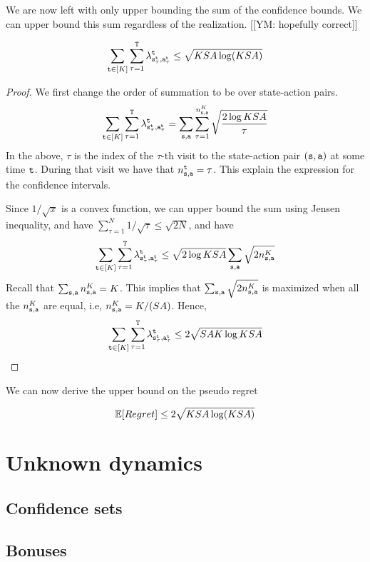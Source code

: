 We are now left with only upper bounding the sum of the confidence bounds.
We can upper bound this sum regardless of the realization. [[YM: hopefully correct]]

\begin{lemma}
    \[
    \sum_{{\tt t}\in [K]} \sum_{\tau=1}^{\tt T}
\lambda^{\tt t}_{{\tt s}_\tau^{\tt t},{\tt a}_\tau^{\tt t}} 
    \leq \sqrt{KSA\log (KSA)}
    \]
\end{lemma}

\begin{proof}
    We first change the order of summation to be over state-action pairs.
    \[
    \sum_{{\tt t}\in [K]} \sum_{\tau=1}^{\tt T}
\lambda^{\tt t}_{{\tt s}_\tau^{\tt t},{\tt a}_\tau^{\tt t}} =
\sum_{{\tt s},{\tt a}} \sum_{\tau=1}^{n_{{\tt s},{\tt a}}^K}
\sqrt{\frac{2\log KSA}{\tau}}
    \]
In the above, $\tau$ is the index of the $\tau$-th visit to the state-action pair $({\tt s},{\tt a})$ at some time ${\tt t}$. During that visit we have that  $n_{{\tt s},{\tt a}}^{\tt t}=\tau$.
This explain the expression for the confidence intervals.
    
Since $1/\sqrt{x}$ is a convex function, we can upper bound the sum using Jensen inequality, and have $\sum_{\tau=1}^N 1/\sqrt{\tau}\leq \sqrt{2N}$, and have 
    \[
    \sum_{{\tt t}\in [K]} \sum_{\tau=1}^{\tt T}
\lambda^{\tt t}_{{\tt s}_\tau^{\tt t},{\tt a}_\tau^{\tt t}} \leq
\sqrt{2\log KSA}
\sum_{{\tt s},{\tt a}}
\sqrt{2 n_{{\tt s},{\tt a}}^K}
    \]
Recall that $\sum_{{\tt s},{\tt a}} n_{{\tt s},{\tt a}}^K =K$. This implies that $\sum_{{\tt s},{\tt a}}
\sqrt{2 n_{{\tt s},{\tt a}}^K}$ is maximized when all the $n_{{\tt s},{\tt a}}^K$ are equal, i.e, $n_{{\tt s},{\tt a}}^K=K/(SA)$. Hence,
    \[
    \sum_{{\tt t}\in [K]} \sum_{\tau=1}^{\tt T}
\lambda^{\tt t}_{{\tt s}_\tau^{\tt t},{\tt a}_\tau^{\tt t}} \leq
2
\sqrt{SAK\log KSA}
    \]
\end{proof}

We can now derive the upper bound on the pseudo regret
\begin{theorem}
    \[
    \mathbb{E}[Regret] \leq 2\sqrt{KSA\log (KSA)}
    \]
\end{theorem}

\section{Unknown dynamics}

\subsection{Confidence sets}


\subsection{Bonuses}